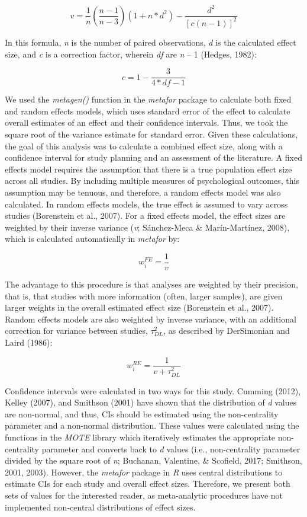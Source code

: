 \documentclass[man, mask]{apa6}
\theoremstyle{definition}
\theoremstyle{definition}
\theoremstyle{definition}
\theoremstyle{remark}
\begin{document}
\[
v = \frac { 1 } { n } (\frac { n - 1 } { n - 3 } )(1 + n*d^2) - \frac { d^2 } { [c(n-1)]^2}
\]

In this formula, \emph{n} is the number of paired observations, \emph{d}
is the calculated effect size, and \emph{c} is a correction factor,
wherein \emph{df} are \emph{n} -- 1 (Hedges, 1982):

\[
c = 1 - \frac { 3 } { 4*df - 1 }
\]

We used the \emph{metagen()} function in the \emph{metafor} package to
calculate both fixed and random effects models, which uses standard
error of the effect to calculate overall estimates of an effect and
their confidence intervals. Thus, we took the square root of the
variance estimate for standard error. Given these calculations, the goal
of this analysis was to calculate a combined effect size, along with a
confidence interval for study planning and an assessment of the
literature. A fixed effects model requires the assumption that there is
a true population effect size across all studies. By including multiple
measures of psychological outcomes, this assumption may be tenuous, and
therefore, a random effects model was also calculated. In random effects
models, the true effect is assumed to vary across studies (Borenstein et
al., 2007). For a fixed effects model, the effect sizes are weighted by
their inverse variance (\emph{v}; Sánchez-Meca \& Marín-Martínez, 2008),
which is calculated automatically in \emph{metafor} by:

\[
w_{i}^{FE} = \frac {1} {v}
\]

The advantage to this procedure is that analyses are weighted by their
precision, that is, that studies with more information (often, larger
samples), are given larger weights in the overall estimated effect size
(Borenstein et al., 2007). Random effects models are also weighted by
inverse variance, with an additional correction for variance between
studies, \(\tau^2_{DL}\), as described by DerSimonian and Laird (1986):

\[
w_{i}^{RE} = \frac {1} {v + \tau^2_{DL}}
\]

Confidence intervals were calculated in two ways for this study. Cumming
(2012), Kelley (2007), and Smithson (2001) have shown that the
distribution of \emph{d} values are non-normal, and thus, CIs should be
estimated using the non-centrality parameter and a non-normal
distribution. These values were calculated using the functions in the
\emph{MOTE} library which iteratively estimates the appropriate
non-centrality parameter and converts back to \emph{d} values (i.e.,
non-centrality parameter divided by the square root of \emph{n};
Buchanan, Valentine, \& Scofield, 2017; Smithson, 2001, 2003). However,
the \emph{metafor} package in \emph{R} uses central distributions to
estimate CIs for each study and overall effect sizes. Therefore, we
present both sets of values for the interested reader, as meta-analytic
procedures have not implemented non-central distributions of effect
sizes.
\end{document}
